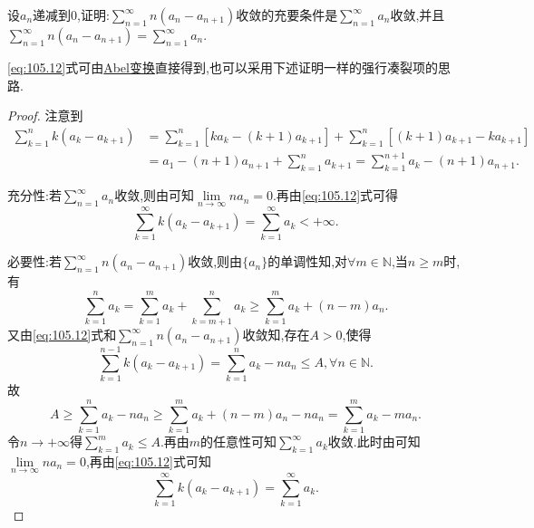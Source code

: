 \documentclass[../../main.tex]{subfiles}
\begin{document}
\begin{proposition}\label{proposition:级数经典命题1}
设$a_n$递减到$0$,证明:$\sum\limits_{n=1}^\infty n\left(a_n-a_{n+1}\right)$收敛的充要条件是$\sum\limits_{n=1}^\infty a_n$收敛,并且$\sum\limits_{n=1}^\infty n\left(a_n-a_{n+1}\right)=\sum\limits_{n=1}^\infty a_n$.
\end{proposition}
\begin{note}
\eqref{eq:105.12}式可由\hyperref[theorem:Abel变换]{Abel变换}直接得到,也可以采用下述证明一样的强行凑裂项的思路.
\end{note}
\begin{proof}
注意到
\begin{align}
\sum_{k=1}^n{k\left( a_k-a_{k+1} \right)}&=\sum_{k=1}^n{\left[ ka_k-\left( k+1 \right) a_{k+1} \right]}+\sum_{k=1}^n{\left[ \left( k+1 \right) a_{k+1}-ka_{k+1} \right]} \nonumber \\
&=a_1-\left( n+1 \right) a_{n+1}+\sum_{k=1}^n{a_{k+1}}=\sum_{k=1}^{n+1}{a_k}-\left( n+1 \right) a_{n+1}. \label{eq:105.12}
\end{align}

{\heiti 充分性:}若$\sum_{n=1}^{\infty}{a_n}$收敛,则由可知$\lim\limits_{n\rightarrow \infty}na_n=0$.再由\eqref{eq:105.12}式可得
$$\sum_{k=1}^{\infty}{k\left( a_k-a_{k+1} \right)}=\sum_{k=1}^{\infty}{a_k}<+\infty .$$

{\heiti 必要性:}若$\sum_{n=1}^{\infty}{n\left( a_n-a_{n+1} \right)}$收敛,则由$\{ a_n \}$的单调性知,对$\forall m\in \mathbb{N}$,当$n\geqslant m$时,有
$$\sum_{k=1}^n{a_k}=\sum_{k=1}^m{a_k}+\sum_{k=m+1}^n{a_k}\geqslant \sum_{k=1}^m{a_k}+\left( n-m \right) a_n.$$
又由\eqref{eq:105.12}式和$\sum_{n=1}^{\infty}{n\left( a_n-a_{n+1} \right)}$收敛知,存在$A>0$,使得
$$\sum_{k=1}^{n-1}{k\left( a_k-a_{k+1} \right)}=\sum_{k=1}^n{a_k}-na_n\leqslant A,\forall n\in \mathbb{N} .$$
故
$$A\geqslant \sum_{k=1}^n{a_k}-na_n\geqslant \sum_{k=1}^m{a_k}+\left( n-m \right) a_n-na_n=\sum_{k=1}^m{a_k}-ma_n.$$
令$n\rightarrow +\infty$得$\sum_{k=1}^m{a_k}\leqslant A$.再由$m$的任意性可知$\sum_{k=1}^{\infty}{a_k}$收敛.此时由可知$\lim\limits_{n\rightarrow \infty}na_n=0$,再由\eqref{eq:105.12}式可知
$$\sum_{k=1}^{\infty}{k\left( a_k-a_{k+1} \right)}=\sum_{k=1}^{\infty}{a_k}.$$

\end{proof}
\end{document}
